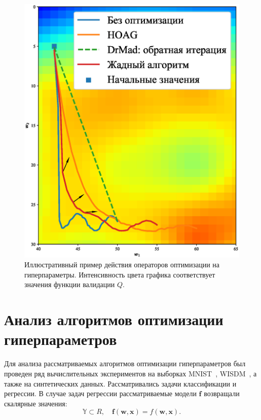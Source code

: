      
\begin{figure}[h!]
\centering
  \includegraphics[width=0.6\linewidth]{plots/hyperparams/Fig_traj.eps}

    \caption{Иллюстративный пример действия операторов оптимизации на гиперпараметры. Интенсивность цвета графика соответствует значения функции валидации $Q$.}
 \label{fig:traj}
   
    \end{figure}




\section{Анализ алгоритмов оптимизации гиперпараметров}
Для анализа рассматриваемых алгоритмов оптимизации гиперпараметров был проведен ряд вычислительных экспериментов на выборках MNIST~\cite{mnist}, WISDM~\cite{wisdm}, а также на синтетических данных. Рассматривались задачи классификации и регрессии. В случае задач регрессии рассматриваемые модели $\mathbf{f}$ возвращали скалярные значения:
\[
    \mathbb{Y} \subset R, \quad \mathbf{f}(\mathbf{w}, \mathbf{x}) = f(\mathbf{w}, \mathbf{x}).
\]

